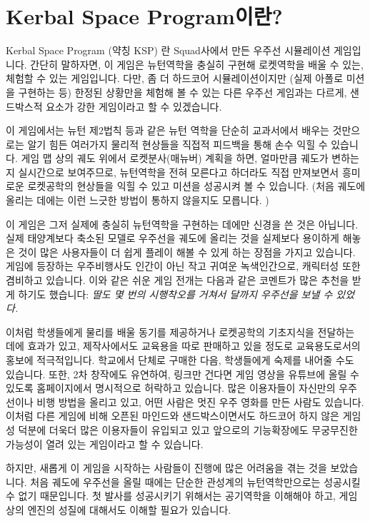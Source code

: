 \chapter*{Kerbal Space Program이란?}
Kerbal Space Program (약칭 KSP) 란 Squad사에서 만든 우주선 시뮬레이션 게임입니다.
간단히 말하자면, 이 게임은 뉴턴역학을 충실히 구현해 로켓역학을 배울 수 있는, 체험할 수 있는 게임입니다.
다만, 좀 더 하드코어 시뮬레이션이지만 (실제 아폴로 미션을 구현하는 등) 한정된 상황만을 체험해 볼 수 있는
다른 우주선 게임과는 다르게,
샌드박스적 요소가 강한 게임이라고 할 수 있겠습니다.

이 게임에서는
뉴턴 제2법칙 등과 같은 뉴턴 역학을 단순히 교과서에서 배우는 것만으로는 알기 힘든
여러가지 물리적 현상들을 직접적 피드백을 통해 손수 익힐 수 있습니다.
게임 맵 상의 궤도 위에서 
로켓분사(매뉴버) 계획을 하면, 얼마만큼 궤도가 변하는지 실시간으로 보여주므로,
뉴턴역학을 전혀 모른다고 하더라도 직접 만져보면서 흥미로운 로켓공학의 현상들을 익힐 수 있고 
미션을 성공시켜 볼 수 있습니다.
(처음 궤도에 올리는 데에는 이런 느긋한 방법이 통하지 않을지도 모릅니다. )


이 게임은 그저 실제에 충실히 뉴턴역학을 구현하는 데에만 신경을 쓴 것은 아닙니다. 
실제 태양계보다 축소된 모델로 우주선을 궤도에 올리는 것을 실제보다 용이하게 해놓은 것이 많은 사용자들이 더 쉽게 플레이 해볼 수 있게 하는 장점을 가지고 있습니다.
게임에 등장하는 우주비행사도 인간이 아닌 작고 귀여운 녹색인간으로, 캐릭터성 또한 겸비하고 있습니다.
이와 같은 쉬운 게임 전개는 다음과 같은 코멘트가 많은 추천을 받게 하기도 했습니다:
\emph{딸도 몇 번의 시행착오를 거쳐서 달까지 우주선을 보낼 수 있었다.}


이처럼 학생들에게 물리를 배울 동기를 제공하거나 로켓공학의 기초지식을 전달하는 데에 효과가 있고,
제작사에서도 교육용을 따로 판매하고 있을 정도로 교육용도로서의 홍보에 적극적입니다.
학교에서 단체로 구매한 다음, 학생들에게 숙제를 내어줄 수도 있습니다.
또한, 2차 창작에도 유연하여, 링크만 건다면 게임 영상을 유튜브에 올릴 수 있도록 홈페이지에서 명시적으로 허락하고 있습니다.
많은 이용자들이 자신만의 우주선이나 비행 방법을 올리고 있고, 어떤 사람은 멋진 우주 영화를 만든 사람도 있습니다.
이처럼 다른 게임에 비해 오픈된 마인드와 샌드박스이면서도 하드코어 하지 않은 게임성 덕분에
더욱더 많은 이용자들이 유입되고 있고 앞으로의 기능확장에도 무궁무진한 가능성이 열려 있는 게임이라고 할 수 있습니다.


하지만, 새롭게 이 게임을 시작하는 사람들이 진행에 많은 어려움을 겪는 것을 보았습니다. 
처음 궤도에 우주선을 올릴 때에는 단순한 관성계의 뉴턴역학만으로는 성공시킬 수 없기 때문입니다.
첫 발사를 성공시키기 위해서는 공기역학을 이해해야 하고, 게임상의 엔진의 성질에 대해서도 이해할 필요가 있습니다.

